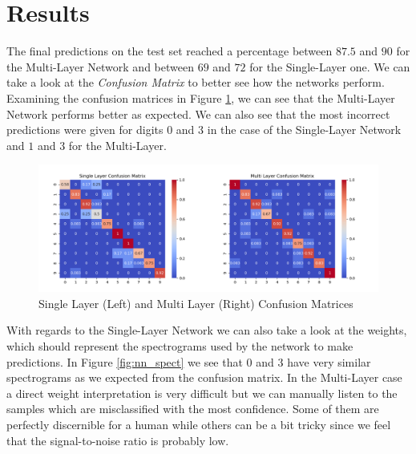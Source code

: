 \documentclass[10pt,a4paper]{report}
\begin{document}
\section{Results}
The final predictions on the test set reached a percentage between $87.5$ and $90$ for the Multi-Layer Network and between $69$ and $72$ for the Single-Layer one. We can take a look at the \textit{Confusion Matrix} to better see how the networks perform. Examining the confusion matrices in Figure \ref{fig:conf_mat}, we can see that the Multi-Layer Network performs better as expected. We can also see that the most incorrect predictions were given for digits $0$ and $3$ in the case of the Single-Layer Network and $1$ and $3$ for the Multi-Layer. 
\begin{figure}[H]
\centering
\includegraphics[width=0.8\linewidth]{conf_mat.png}
\caption{Single Layer (Left) and Multi Layer (Right) Confusion Matrices}
\label{fig:conf_mat}
\end{figure}
With regards to the Single-Layer Network we can also take a look at the weights, which should represent the spectrograms used by the network to make predictions. In Figure \ref{fig:nn_spect} we see that $0$ and $3$ have very similar spectrograms as we expected from the confusion matrix. In the Multi-Layer case a direct weight interpretation is very difficult but we can manually listen to the samples which are misclassified with the most confidence. Some of them are perfectly discernible for a human while others can be a bit tricky since we feel that the signal-to-noise ratio is probably low.
\end{document}
